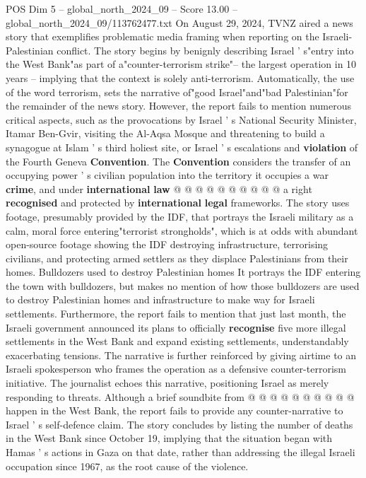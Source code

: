 \begin{textsample}{POS Dim 5 – global\_north\_2024\_09 – Score 13.00 – global\_north\_2024\_09/113762477.txt}
On August 29, 2024, TVNZ aired a news story that exemplifies problematic media framing when reporting on the Israeli-Palestinian conflict.
The story begins by benignly describing Israel ' s"entry into the West Bank"as part of a"counter-terrorism strike"-- the largest operation in 10 years -- implying that the context is solely anti-terrorism.
Automatically, the use of the word terrorism, sets the narrative of"good Israel"and"bad Palestinian"for the remainder of the news story.
However, the report fails to mention numerous critical aspects, such as the provocations by Israel ' s National Security Minister, Itamar Ben-Gvir, visiting the Al-Aqsa Mosque and threatening to build a synagogue at Islam ' s third holiest site, or Israel ' s escalations and \textbf{violation} of the Fourth Geneva \textbf{Convention}.
The \textbf{Convention} considers the transfer of an occupying power ' s civilian population into the territory it occupies a war \textbf{crime}, and under \textbf{international} \textbf{law} @ @ @ @ @ @ @ @ @ @ a right \textbf{recognised} and protected by \textbf{international} \textbf{legal} frameworks.
The story uses footage, presumably provided by the IDF, that portrays the Israeli military as a calm, moral force entering"terrorist strongholds", which is at odds with abundant open-source footage showing the IDF destroying infrastructure, terrorising civilians, and protecting armed settlers as they displace Palestinians from their homes.
Bulldozers used to destroy Palestinian homes It portrays the IDF entering the town with bulldozers, but makes no mention of how those bulldozers are used to destroy Palestinian homes and infrastructure to make way for Israeli settlements.
Furthermore, the report fails to mention that just last month, the Israeli government announced its plans to officially \textbf{recognise} five more illegal settlements in the West Bank and expand existing settlements, understandably exacerbating tensions.
The narrative is further reinforced by giving airtime to an Israeli spokesperson who frames the operation as a defensive counter-terrorism initiative.
The journalist echoes this narrative, positioning Israel as merely responding to threats.
Although a brief soundbite from @ @ @ @ @ @ @ @ @ @ happen in the West Bank, the report fails to provide any counter-narrative to Israel ' s self-defence claim.
The story concludes by listing the number of deaths in the West Bank since October 19, implying that the situation began with Hamas ' s actions in Gaza on that date, rather than addressing the illegal Israeli occupation since 1967, as the root cause of the violence.

\end{textsample}
